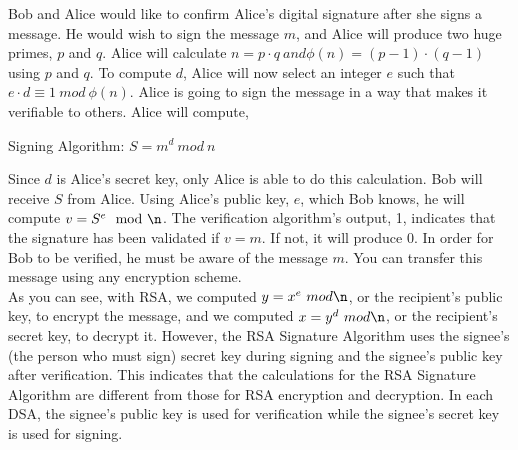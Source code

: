 \documentclass[11pt]{article}
\begin{document}
Bob and Alice would like to confirm Alice's digital signature after she signs a message. He would wish to sign the message $m$, and Alice will produce two huge primes, $p$ and $q$. Alice will calculate $n = p \cdot q \ and \phi(n) = (p-1) \cdot (q-1)$ using $p$ and $q$. To compute $d$, Alice will now select an integer $e$ such that $e \cdot d \equiv 1 \ mod \ \phi(n)$. Alice is going to sign the message in a way that makes it verifiable to others. Alice will compute,
\begin{center}
    Signing Algorithm: $S = m^d \ mod \ n$
\end{center}
Since $d$ is Alice's secret key, only Alice is able to do this calculation. Bob will receive $S$ from Alice. Using Alice's public key, $e$, which Bob knows, he will compute $v = S^e \mod \n$. The verification algorithm's output, 1, indicates that the signature has been validated if $v = m$. If not, it will produce 0. In order for Bob to be verified, he must be aware of the message $m$. You can transfer this message using any encryption scheme.\\
\newline
As you can see, with RSA, we computed $y = x^e \ mod \n$, or the recipient's public key, to encrypt the message, and we computed $x = y^d \ mod \n$, or the recipient's secret key, to decrypt it. However, the RSA Signature Algorithm uses the signee's (the person who must sign) secret key during signing and the signee's public key after verification. This indicates that the calculations for the RSA Signature Algorithm are different from those for RSA encryption and decryption. In each DSA, the signee's public key is used for verification while the signee's secret key is used for signing.\\
\newline
\end{document}
